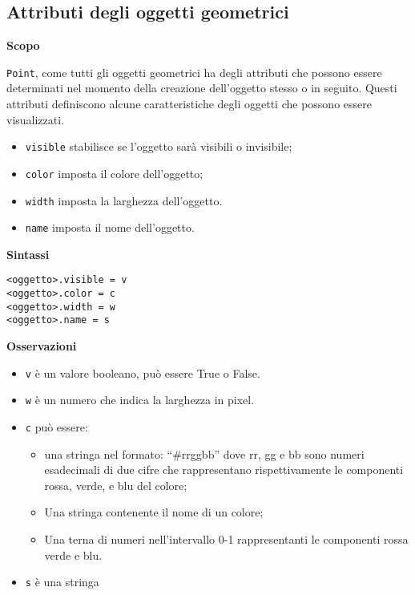 \subsection{Attributi degli oggetti geometrici}
\label{sub:geoint_attributi}
\textbf{Scopo}

\texttt{Point}, come tutti gli oggetti geometrici ha degli attributi che 
possono essere determinati nel momento della creazione dell'oggetto stesso o in
seguito. Questi attributi definiscono alcune caratteristiche degli oggetti che
possono essere visualizzati.

\begin{itemize} [noitemsep]
\item \texttt{visible} stabilisce se l'oggetto sarà visibili o invisibile;
\item \texttt{color} imposta il colore dell'oggetto;
\item \texttt{width} imposta la larghezza dell'oggetto.
\item \texttt{name} imposta il nome dell'oggetto.
\end{itemize}

\textbf{Sintassi}

\begin{lstlisting}
<oggetto>.visible = v
<oggetto>.color = c
<oggetto>.width = w
<oggetto>.name = s
\end{lstlisting}

\textbf{Osservazioni}

\begin{itemize} [noitemsep]
\item \texttt{v} è un valore booleano, può essere True o False.
\item \texttt{w} è un numero che indica la larghezza in pixel.
\item \texttt{c} può essere:

\begin{itemize} [noitemsep]
\item una stringa nel formato: ``\#rrggbb'' dove rr, gg e bb sono numeri
esadecimali di due cifre che rappresentano rispettivamente le componenti
rossa, verde, e blu del colore;
\item Una stringa contenente il nome di un colore;
\item Una terna di numeri nell'intervallo 0-1 rappresentanti le componenti
rossa verde e blu.
\end{itemize}

\item \texttt{s} è una stringa
\end{itemize}

